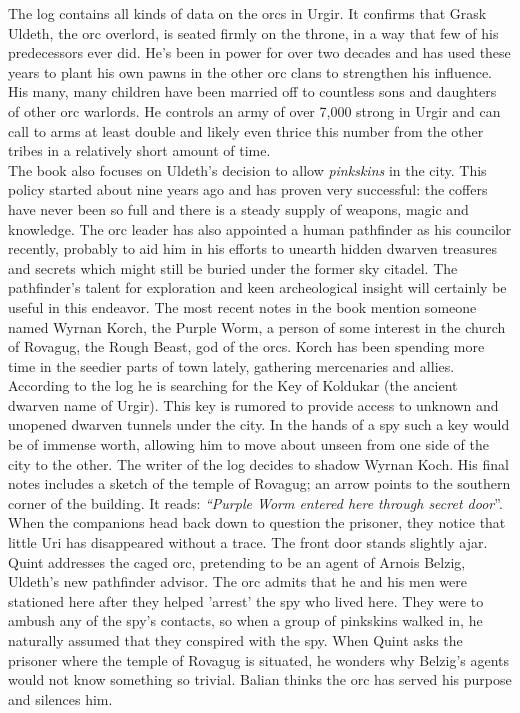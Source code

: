 The log contains all kinds of data on the orcs in Urgir. It confirms that Grask Uldeth, the orc overlord, is seated firmly on the throne, in a way that few of his predecessors ever did. He's been in power for over two decades and has used these years to plant his own pawns in the other orc clans to strengthen his influence. His many, many children have been married off to countless sons and daughters of other orc warlords. He controls an army of over 7,000 strong in Urgir and can call to arms at least double and likely even thrice this number from the other tribes in a relatively short amount of time.\\

The book also focuses on Uldeth's decision to allow {\itshape pinkskins} in the city. This policy started about nine years ago and has proven very successful: the coffers have never been so full and there is a steady supply of weapons, magic and knowledge. The orc leader has also appointed a human pathfinder as his councilor recently, probably to aid him in his efforts to unearth hidden dwarven treasures and secrets which might still be buried under the former sky citadel. The pathfinder's talent for exploration and keen archeological insight will certainly be useful in this endeavor. The most recent notes in the book mention someone named Wyrnan Korch, the Purple Worm, a person of some interest in the church of Rovagug, the Rough Beast, god of the orcs. Korch has been spending more time in the seedier parts of town lately, gathering mercenaries and allies. According to the log he is searching for the Key of Koldukar (the ancient dwarven name of Urgir). This key is rumored to provide access to unknown and unopened dwarven tunnels under the city. In the hands of a spy such a key would be of immense worth, allowing him to move about unseen from one side of the city to the other. The writer of the log decides to shadow Wyrnan Koch. His final notes includes a sketch of the temple of Rovagug; an arrow points to the southern corner of the building. It reads: {\itshape``Purple Worm entered here through secret door}''.\\

When the companions head back down to question the prisoner, they notice that little Uri has disappeared without a trace. The front door stands slightly ajar. Quint addresses the caged orc, pretending to be an agent of Arnois Belzig, Uldeth's new pathfinder advisor. The orc admits that he and his men were stationed here after they helped 'arrest' the spy who lived here. They were to ambush any of the spy's contacts, so when a group of pinkskins walked in, he naturally assumed that they conspired with the spy. When Quint asks the prisoner where the temple of Rovagug is situated, he wonders why Belzig's agents would not know something so trivial. Balian thinks the orc has served his purpose and silences him.\\

